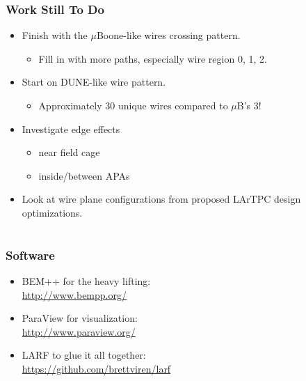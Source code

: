 \documentclass[xcolor=dvipsnames]{beamer}
\begin{document}
\begin{frame}
  \frametitle{Work Still To Do}
  \begin{itemize}
  \item Finish with the $\mu$Boone-like wires crossing pattern.
    \begin{itemize}
    \item Fill in with more paths, especially wire region 0, 1, 2.
    \end{itemize}
  \item Start on DUNE-like wire pattern.
    \begin{itemize}\footnotesize
    \item Approximately 30 unique wires compared to $\mu$B's 3!
    \end{itemize}
  \item Investigate edge effects 
    \begin{itemize}\footnotesize
    \item near field cage
    \item inside/between APAs
    \end{itemize}
  \item Look at wire plane configurations from proposed LArTPC design optimizations.
  \end{itemize}
\end{frame}

\section{}
\begin{frame}
  \frametitle{Software}
  \begin{itemize}
  \item BEM++ for the heavy lifting: \\
    \url{http://www.bempp.org/}
  \item ParaView for visualization: \\
    \url{http://www.paraview.org/}
  \item LARF to glue it all together: \\
    \url{https://github.com/brettviren/larf}
  \end{itemize}
  
\end{frame}
\end{document}
